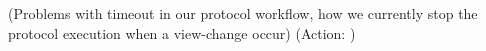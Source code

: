 (Problems with timeout in our protocol workflow, how we currently stop the protocol execution when a view-change occur)
(Action: )
\fi


